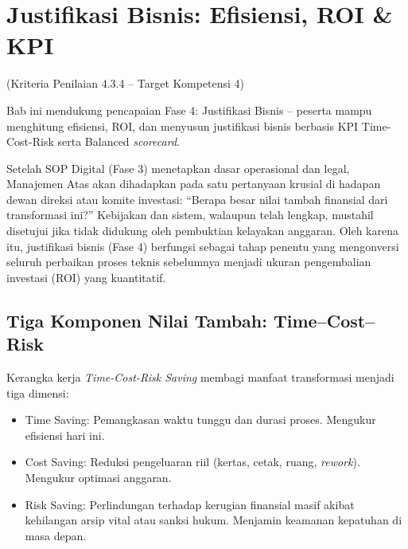 \documentclass[12pt,a4paper]{report}
\begin{document}
\chapter{Justifikasi Bisnis: Efisiensi, ROI \& KPI}
(Kriteria Penilaian 4.3.4 -- Target Kompetensi 4)

Bab ini mendukung pencapaian Fase 4: Justifikasi Bisnis -- peserta mampu menghitung efisiensi, ROI, dan menyusun justifikasi bisnis berbasis KPI Time-Cost-Risk serta Balanced \textit{scorecard}. 

Setelah SOP Digital (Fase 3) menetapkan dasar operasional dan legal, Manajemen Atas akan dihadapkan pada satu pertanyaan krusial di hadapan dewan direksi atau komite investasi: ``Berapa besar nilai tambah finansial dari transformasi ini?'' Kebijakan dan sistem, walaupun telah lengkap, mustahil disetujui jika tidak didukung oleh pembuktian kelayakan anggaran. Oleh karena itu, justifikasi bisnis (Fase 4) berfungsi sebagai tahap penentu yang mengonversi seluruh perbaikan proses teknis sebelumnya menjadi ukuran pengembalian investasi (ROI) yang kuantitatif.


\section{Tiga Komponen Nilai Tambah: Time--Cost--Risk}
Kerangka kerja \textit{Time-Cost-Risk Saving} membagi manfaat transformasi menjadi tiga dimensi:
\begin{itemize}[leftmargin=*]
    \item Time Saving: Pemangkasan waktu tunggu dan durasi proses. Mengukur efisiensi hari ini.
    \item Cost Saving: Reduksi pengeluaran riil (kertas, cetak, ruang, \textit{rework}). Mengukur optimasi anggaran.
    \item Risk Saving: Perlindungan terhadap kerugian finansial masif akibat kehilangan arsip vital atau sanksi hukum. Menjamin keamanan kepatuhan di masa depan.
\end{itemize}

\end{document}
